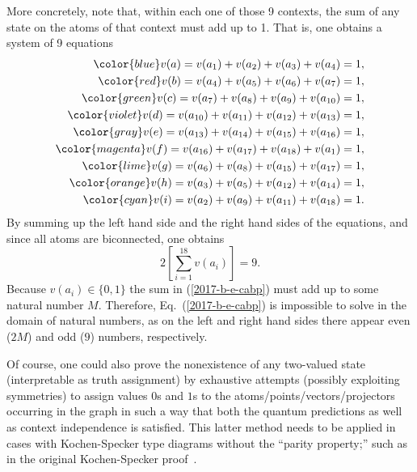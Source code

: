 {More concretely,  note that, within each one of those 9 contexts,
the sum of any state on the atoms of that context must add up to 1.
That is, %
one obtains a system of 9 equations
\begin{equation}
\begin{split}
\color{blue}        v(a)= v( a_1 ) + v( a_2 ) + v( a_3 ) + v( a_4 ) = 1 ,                  \\
\color{red}         v(b)= v( a_4 ) + v( a_5 ) + v( a_6 ) + v( a_7 ) = 1 ,                  \\
\color{green}       v(c)= v( a_7 ) + v( a_8 ) + v( a_9 ) + v( a_{10} ) = 1 ,               \\
\color{violet}      v(d)= v( a_{10} ) + v( a_{11} ) + v( a_{12} ) + v( a_{13} ) = 1 ,      \\
\color{gray}        v(e)= v( a_{13} ) + v( a_{14} ) + v( a_{15} ) + v( a_{16} ) = 1 ,      \\
\color{magenta}     v(f)= v( a_{16} ) + v( a_{17} ) + v( a_{18} ) + v( a_1 ) = 1 ,         \\
\color{lime}        v(g)= v( a_6 ) + v( a_8 ) + v( a_{15} ) + v( a_{17} ) = 1 ,            \\
\color{orange}      v(h)= v( a_3 ) + v( a_5 ) + v( a_{12} ) + v( a_{14} ) = 1 ,            \\
\color{cyan}        v(i)= v( a_2 ) + v( a_9 ) + v( a_{11} ) + v( a_{18} ) = 1 .
\label{2017-b-e-cabp-conf}
\end{split}
\end{equation}
By summing up the left hand side and the right hand sides of the equations, and since all atoms are biconnected,
one obtains
\begin{equation}
2 \left[\sum_{i=1}^{18} v(a_i)\right] = 9.
\label{2017-b-e-cabp}
\end{equation}
Because $v(a_i)\in \{0,1\}$ the sum in (\ref{2017-b-e-cabp}) must add up to some natural number $M$.
Therefore, Eq.~(\ref{2017-b-e-cabp}) is impossible to solve in the domain of natural numbers,
as on the left and right hand sides there appear even ($2M$) and odd ($9$) numbers, respectively.

Of course, one could also prove the nonexistence of any  two-valued state (interpretable as truth assignment)
by exhaustive attempts
(possibly exploiting symmetries) to assign values $0$s and $1$s to the atoms/points/vectors/projectors occurring in the graph
in such a way that both the quantum predictions as well as context independence is satisfied.
This latter method needs to be applied in cases with Kochen-Specker type diagrams without the  ``parity property;''
such as in the original Kochen-Specker proof~\cite[-20mm]{kochen1}.

\bproof
}


